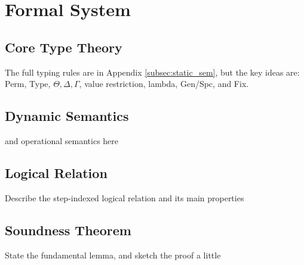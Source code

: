 \section{Formal System}\label{sec:formal_system}

\subsection{Core Type Theory}

The full typing rules are in Appendix \ref{subsec:static_sem}, but the key
ideas are: \textsf{Perm}, \textsf{Type}, $\Theta, \Delta, \Gamma$,
value restriction, lambda, Gen/Spc, and Fix.

\subsection{Dynamic Semantics}\label{subsec:semantics}

and operational semantics here

\subsection{Logical Relation}

Describe the step-indexed logical relation and its main properties 

\subsection{Soundness Theorem}

State the fundamental lemma, and sketch the proof a little

